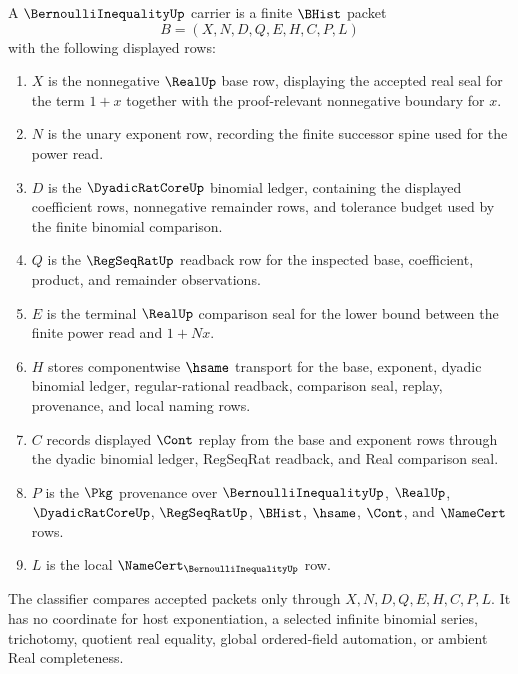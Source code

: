 \begin{definition}\label{def:bernoulli-inequality-carrier}
A $\BernoulliInequalityUp$ carrier is a finite $\BHist$ packet
$$
B=(X,N,D,Q,E,H,C,P,L)
$$
with the following displayed rows:
\begin{enumerate}
\item $X$ is the nonnegative $\RealUp$ base row, displaying the accepted real seal for the term $1+x$ together with the proof-relevant nonnegative boundary for $x$.
\item $N$ is the unary exponent row, recording the finite successor spine used for the power read.
\item $D$ is the $\DyadicRatCoreUp$ binomial ledger, containing the displayed coefficient rows, nonnegative remainder rows, and tolerance budget used by the finite binomial comparison.
\item $Q$ is the $\RegSeqRatUp$ readback row for the inspected base, coefficient, product, and remainder observations.
\item $E$ is the terminal $\RealUp$ comparison seal for the lower bound between the finite power read and $1+Nx$.
\item $H$ stores componentwise $\hsame$ transport for the base, exponent, dyadic binomial ledger, regular-rational readback, comparison seal, replay, provenance, and local naming rows.
\item $C$ records displayed $\Cont$ replay from the base and exponent rows through the dyadic binomial ledger, RegSeqRat readback, and Real comparison seal.
\item $P$ is the $\Pkg$ provenance over $\BernoulliInequalityUp$, $\RealUp$, $\DyadicRatCoreUp$, $\RegSeqRatUp$, $\BHist$, $\hsame$, $\Cont$, and $\NameCert$ rows.
\item $L$ is the local $\NameCert_{\BernoulliInequalityUp}$ row.
\end{enumerate}
The classifier compares accepted packets only through $X,N,D,Q,E,H,C,P,L$. It has no coordinate for host exponentiation, a selected infinite binomial series, trichotomy, quotient real equality, global ordered-field automation, or ambient Real completeness.
\end{definition}

